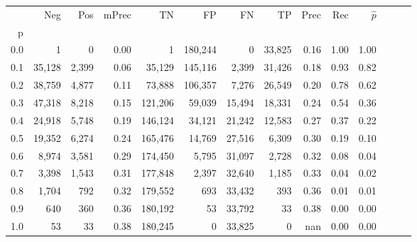 \begin{tabular}{rrrrrrrrrrrrrr}
\toprule
{} &     Neg &    Pos & mPrec &       TN &       FP &      FN &      TP &  Prec &   Rec & $\hat{p}$ \\
p   &         &        &       &          &          &         &         &       &       &           \\
\midrule
0.0 &       1 &      0 &  0.00 &        1 &  180,244 &       0 &  33,825 &  0.16 &  1.00 &      1.00 \\
0.1 &  35,128 &  2,399 &  0.06 &   35,129 &  145,116 &   2,399 &  31,426 &  0.18 &  0.93 &      0.82 \\
0.2 &  38,759 &  4,877 &  0.11 &   73,888 &  106,357 &   7,276 &  26,549 &  0.20 &  0.78 &      0.62 \\
0.3 &  47,318 &  8,218 &  0.15 &  121,206 &   59,039 &  15,494 &  18,331 &  0.24 &  0.54 &      0.36 \\
0.4 &  24,918 &  5,748 &  0.19 &  146,124 &   34,121 &  21,242 &  12,583 &  0.27 &  0.37 &      0.22 \\
0.5 &  19,352 &  6,274 &  0.24 &  165,476 &   14,769 &  27,516 &   6,309 &  0.30 &  0.19 &      0.10 \\
0.6 &   8,974 &  3,581 &  0.29 &  174,450 &    5,795 &  31,097 &   2,728 &  0.32 &  0.08 &      0.04 \\
0.7 &   3,398 &  1,543 &  0.31 &  177,848 &    2,397 &  32,640 &   1,185 &  0.33 &  0.04 &      0.02 \\
0.8 &   1,704 &    792 &  0.32 &  179,552 &      693 &  33,432 &     393 &  0.36 &  0.01 &      0.01 \\
0.9 &     640 &    360 &  0.36 &  180,192 &       53 &  33,792 &      33 &  0.38 &  0.00 &      0.00 \\
1.0 &      53 &     33 &  0.38 &  180,245 &        0 &  33,825 &       0 &   nan &  0.00 &      0.00 \\
\bottomrule
\end{tabular}
